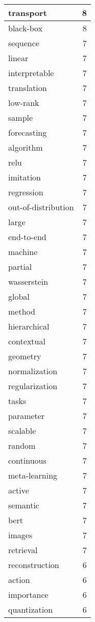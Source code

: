 \begin{table}[h]
\begin{tabular}{|l|r|}
\hline
transport & 8 \\
\hline
black-box & 8 \\
\hline
sequence & 7 \\
\hline
linear & 7 \\
\hline
interpretable & 7 \\
\hline
translation & 7 \\
\hline
low-rank & 7 \\
\hline
sample & 7 \\
\hline
forecasting & 7 \\
\hline
algorithm & 7 \\
\hline
relu & 7 \\
\hline
imitation & 7 \\
\hline
regression & 7 \\
\hline
out-of-distribution & 7 \\
\hline
large & 7 \\
\hline
end-to-end & 7 \\
\hline
machine & 7 \\
\hline
partial & 7 \\
\hline
wasserstein & 7 \\
\hline
global & 7 \\
\hline
method & 7 \\
\hline
hierarchical & 7 \\
\hline
contextual & 7 \\
\hline
geometry & 7 \\
\hline
normalization & 7 \\
\hline
regularization & 7 \\
\hline
tasks & 7 \\
\hline
parameter & 7 \\
\hline
scalable & 7 \\
\hline
random & 7 \\
\hline
continuous & 7 \\
\hline
meta-learning & 7 \\
\hline
active & 7 \\
\hline
semantic & 7 \\
\hline
bert & 7 \\
\hline
images & 7 \\
\hline
retrieval & 7 \\
\hline
reconstruction & 6 \\
\hline
action & 6 \\
\hline
importance & 6 \\
\hline
quantization & 6 \\

\end{tabular}
\end{table}
